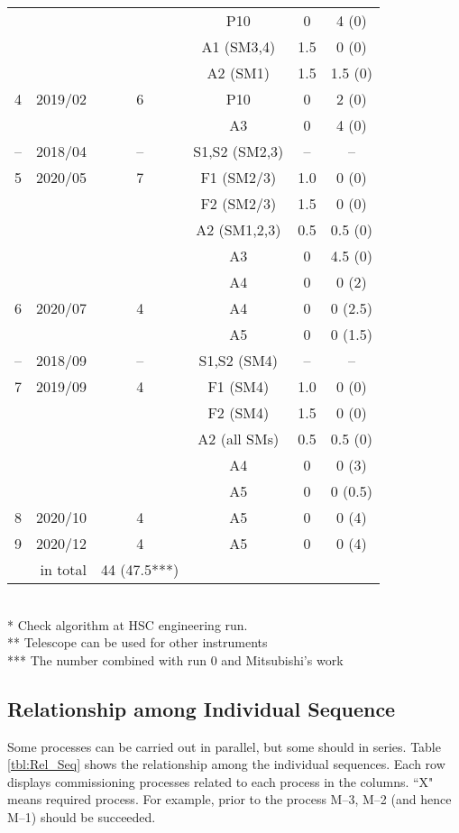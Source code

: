 {\begin{table}[!ht]
\begin{center}
\begin{tabular}{*{3}{c}|*{3}{c}}
	&	&					& P10  			& 0 	& 4 (0)	\\
	&	&					& A1 (SM3,4)	& 1.5 	& 0 (0)	\\
	&	&					& A2 (SM1)	& 1.5 	& 1.5 (0)	\\ \hline
4	& 2019/02	& 6 		& P10 			& 0 	& 2 (0)	\\
	&	&					& A3 			& 0 	& 4 (0)	\\ \hline
--	& 2018/04			& --		& S1,S2 (SM2,3)		& --		& --	\\ \hline
5	& 2020/05	& 7			& F1 (SM2/3)		& 1.0 	& 0 (0)	\\
	&	&					& F2 (SM2/3)		& 1.5 	& 0 (0)	\\
	&	&					& A2 (SM1,2,3)	& 0.5	& 0.5 (0)	\\
	&	&					& A3			& 0		& 4.5 (0)	\\
	&	&					& A4			& 0		& 0 (2)	\\ \hline
6	& 2020/07	& 4			& A4			& 0		& 0	(2.5)	\\
	&	&					& A5			& 0		& 0 (1.5)	\\ \hline
--	& 2018/09			& --		& S1,S2 (SM4)		& --		& --	\\ \hline
7	& 2019/09	& 4			& F1 (SM4)		& 1.0 	& 0 (0)	\\
	&	&					& F2 (SM4)		& 1.5 	& 0 (0)	\\
	&	&					& A2 (all SMs)	& 0.5 	& 0.5 (0)	\\
	&	&					& A4			& 0		& 0 (3)	\\
	&	&					& A5			& 0		& 0 (0.5)	\\ \hline
8	& 2020/10	& 4			& A5			& 0		& 0 (4)	\\ \hline
9	& 2020/12	& 4			& A5			& 0		& 0 (4)	\\ \hline \hline
\multicolumn{2}{r}{in total}& 44 (47.5***) \\ \hline
\end{tabular}
\\
* Check algorithm at HSC engineering run. \\
** Telescope can be used for other instruments \\
*** The number combined with run 0 and Mitsubishi's work
\end{center}
\end{table}

\clearpage

\subsection{Relationship among Individual Sequence}
Some processes can be carried out in parallel, but some should in series.
Table \ref{tbl:Rel_Seq} shows the relationship among the individual sequences.
Each row displays commissioning processes related to each process in the columns.
``X" means required process.
For example, prior to the process M--3, M--2 (and hence M--1) should be succeeded.

}
